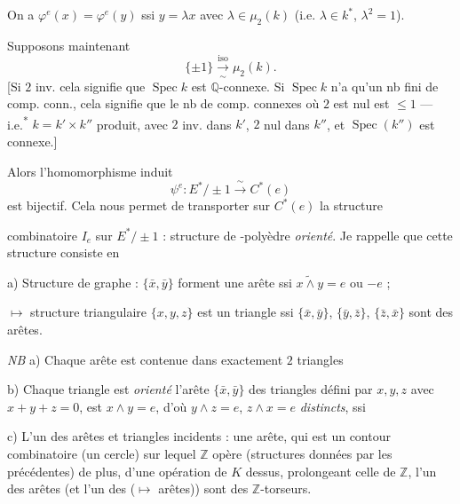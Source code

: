 \documentclass[11pt,a4paper]{article}
\begin{document}
On a $\varphi^e(x) = \varphi^e(y)$ ssi $y = \lambda x$ avec $\lambda\in\mu_2(k)$ (i.e. $\lambda\in k^*$, $\lambda^2 = 1$).

Supposons maintenant
\[
  \{\pm 1\} \xrightarrow[\sim]{\text{iso}} \mu_2(k) .
\]
[Si $2$ inv. cela signifie que $\operatorname{Spec} k$ est $\mathbb{Q}$-connexe. Si $\operatorname{Spec} k$ n'a qu'un nb fini de comp. conn., cela signifie que \struck{\ill{}} le nb de comp. connexes où $2$ est nul est $\leq 1$ — i.e.\textsuperscript{*} $k = k'\times k''$ \struck{\ill{}} produit, avec $2$ inv. dans $k'$, $2$ nul dans $k''$, et $\operatorname{Spec}(k'')$ est connexe.]

Alors l'homomorphisme induit
\[
  \psi^e : E^*/\pm 1 \xrightarrow{\ \sim\ } C^*(e)
\]
est bijectif. Cela nous permet de transporter sur $C^*(e)$ la structure


combinatoire $I_e$ sur $E^*/\pm 1$ : structure de  -polyèdre \emph{orienté}. Je rappelle que cette structure consiste en

a) Structure de graphe : $\{\bar x,\bar y\}$ forment une arête \struck{\ill{}} ssi $\widetilde{x\wedge y} = e$ ou $-e$ ;

$\longmapsto$ structure triangulaire $\{x,y,z\}$ est un triangle ssi $\{\bar x,\bar y\}$, $\{\bar y,\bar z\}$, $\{\bar z,\bar x\}$ sont des arêtes.

\emph{NB} a) Chaque arête est contenue dans exactement $2$ triangles 

b) Chaque triangle est \emph{orienté}  l'arête $\{\bar x,\bar y\}$ des triangles défini par $x,y,z$ avec $x+y+z = 0$,  est \ill{} $x\wedge y = e$, d'où $y\wedge z = e$, $z\wedge x = e$ \emph{distincts}, ssi  

c) L'un des arêtes et triangles incidents : une arête, qui est un contour combinatoire (un cercle) sur lequel $\mathbb{Z}$ opère (structures données par les précédentes) \ill{} \ill{} de plus, d'une opération de $K$ dessus, prolongeant celle de $\mathbb{Z}$, \add{(\ill{} \ill{})} \ill{} l'un des arêtes (et l'un des  ($\longmapsto$ arêtes)) sont des $\mathbb{Z}$-torseurs.
\end{document}
